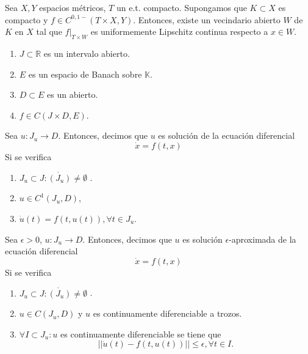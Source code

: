 \begin{prop}
  Sea $X,Y$ espacios métricos, $T$ un e.t. compacto. Supongamos que $K \subset X$ es compacto y $f \in C^{0,1-}(T \times X, Y)$. Entonces, existe un vecindario abierto $W$ de $K$ en $X$ tal que $f|_{T \times W}$ es uniformemente Lipschitz continua respecto a $x \in W$.
\end{prop}

\begin{nota}
  \begin{enumerate}[label=(\roman*)]
    \item $J \subset \mathbb{R}$ es un intervalo abierto.
    \item $E$ es un espacio de Banach sobre $\mathbb{K}$.
    \item $D \subset E$ es un abierto.
    \item $ f \in C(J \times D, E)$.
  \end{enumerate}
\end{nota}

\begin{defn}
  Sea $u: J_{u} \to D$. Entonces, decimos que $u$ es solución de la ecuación diferencial \[ 
    \dot{x} = f(t,x) 
  \] 
  Si se verifica
  \begin{enumerate}[label=(\roman*)]
    \item $J_{u} \subset J : \mathring{(J_{u})} \neq \emptyset$ .
    \item $u \in C^{1}(J_{u}, D)$,
    \item $\dot{u}(t) = f(t, u(t)), \forall t \in J_{u}$.
  \end{enumerate}
\end{defn}

\begin{defn}
  Sea $\epsilon > 0$, $u: J_{u} \to D$. Entonces, decimos que $u$ es solución $\epsilon$-aproximada de la ecuación diferencial \[ 
    \dot{x} = f(t,x) 
  \] 
  Si se verifica
  \begin{enumerate}[label=(\roman*)]
    \item $J_{u} \subset J : \mathring{(J_{u})} \neq \emptyset$ .
    \item $u \in C(J_{u}, D)$ y $u$ es continuamente diferenciable a trozos.
    \item $\forall I \subset J_{u}: u$ es continuamente diferenciable se tiene que
      \[ 
        ||\dot{u}(t) - f(t, u(t))|| \leq \epsilon, \forall t \in I. 
      \] 
  \end{enumerate}
\end{defn}


